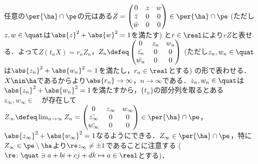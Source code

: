\begin{npfwn}
  任意の$\per{\ha}\cap\pe $の元はある$Z =
  \begin{pmatrix}
    0 & z & w \\
    \bar{z} & 0 & 0 \\
    \bar{w} & 0 & 0 
  \end{pmatrix} \in \per{\ha}\cap\pe $ (ただし$z,w\in \quat$は$ \abs{z}^2 +\abs{w}^2  = 1 $を満たす) と$r\in \real$により$rZ$と表せる．よって$Z(t_nX) = r_nZ_n$，$Z_n\defeq \begin{pmatrix}
    0 & z_n & w_n \\
    \bar{z_n} & 0 & 0 \\
    \bar{w_n} & 0 & 0 
  \end{pmatrix} $ (ただし$z_n,w_n\in \quat $は$ \abs{z_n}^2 +\abs{w_n}^2  = 1 $を満たし，$r_n\in \real$とする) の形で表わせる．$X\nin\ha$であるからより$\abs{r_n}\to \infty $，$n\to \infty$である．$z_n,w_n\in \quat $は$ \abs{z_n}^2 +\abs{w_n}^2  = 1 $を満たすから，$\{t_n\} $の部分列を取るとある$z_{\infty},w_{\infty}\in\quad $が存在して$Z_{\infty}\defeq \lim_{n\to \infty}Z_n  =
  \begin{pmatrix}
    0 & z_{\infty} & w_{\infty} \\
    \bar{z_{\infty}} & 0 & 0 \\
    \bar{w_{\infty}} & 0 & 0 
  \end{pmatrix}
  \in \per{\ha}\cap\pe $，$\abs{z_{\infty}}^2 +\abs{w_{\infty} }^2  = 1$なるようにできる．$Z_{\infty}\in \per{\ha}\cap\pe$，特に$Z_{\infty} \in\pe\setminus \ha $より$\re z_{\infty} \neq \pm 1$であることに注意する ($\re\colon \quat\ni a+bi+cj+dk\mapsto a\in \real$とする)．


\end{npfwn}
